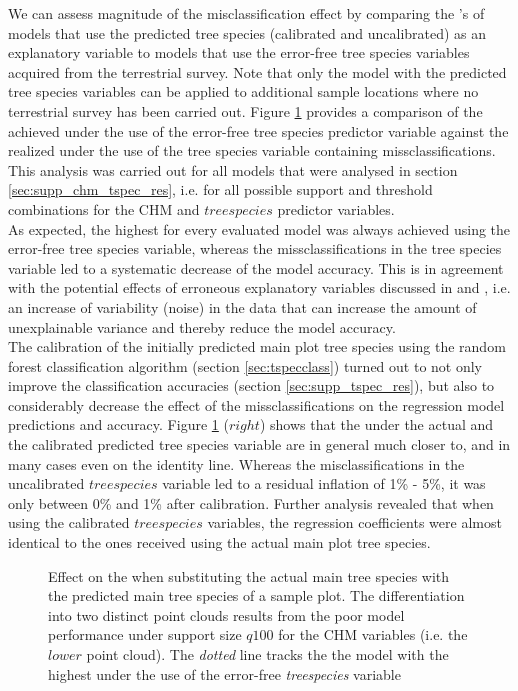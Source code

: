 We can assess magnitude of the misclassification effect by comparing the \adjrsq{}'s of models that use the predicted tree species (calibrated and uncalibrated) as an explanatory variable to models that use the error-free tree species variables acquired from the terrestrial survey. Note that only the model with the predicted tree species variables can be applied to additional sample locations where no terrestrial survey has been carried out. Figure \ref{fig:supp_r2_calnocal} provides a comparison of the \adjrsq{} achieved under the use of the error-free tree species predictor variable against the \adjrsq{} realized under the use of the tree species variable containing missclassifications. This analysis was carried out for all models that were analysed in section \ref{sec:supp_chm_tspec_res}, i.e. for all possible support and threshold combinations for the CHM and $treespecies$ predictor variables.\\
As expected, the highest \adjrsq{} for every evaluated model was always achieved using the error-free tree species variable, whereas the missclassifications in the tree species variable led to a systematic decrease of the model accuracy. This is in agreement with the potential effects of erroneous explanatory variables discussed in \citet{carroll2006} and \citet{gustafson2003}, i.e. an increase of variability (noise) in the data that can increase the amount of unexplainable variance and thereby reduce the model accuracy.\\
The calibration of the initially predicted main plot tree species using the random forest classification algorithm (section \ref{sec:tspecclass}) turned out to not only improve the classification accuracies (section \ref{sec:supp_tspec_res}), but also to considerably decrease the effect of the missclassifications on the regression model predictions and accuracy. Figure \ref{fig:supp_r2_calnocal} ($right$) shows that the \adjrsq{} under the actual and the calibrated predicted tree species variable are in general much closer to, and in many cases even on the identity line. Whereas the misclassifications in the uncalibrated $treespecies$ variable led to a residual inflation of 1\% - 5\%, it was only between 0\% and 1\% after calibration. Further analysis revealed that when using the calibrated $treespecies$ variables, the regression coefficients were almost identical to the ones received using the actual main plot tree species.

\begin{figure}
\centering
{}
\caption{Effect on the \adjrsq{} when substituting the actual main tree species with the predicted  main tree species of a sample plot. The differentiation into two distinct point clouds results from the poor model performance under support size $q100$ for the CHM variables (i.e. the $lower$ point cloud). The \textit{dotted} line tracks the the model with the highest \adjrsq{} under the use of the error-free \textit{treespecies} variable}
\label{fig:supp_r2_calnocal}
\end{figure}


